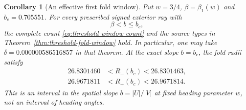 \documentclass[11pt,a4paper]{article}
\newtheorem{corollary}[theorem]{Corollary}
\theoremstyle{remark}\newtheorem{remark}[theorem]{Remark}
\begin{document}
\begin{corollary}[An effective first fold window]
\label{cor:effective-fold-window}
Put $w=3/4$, $\beta=\beta_1(w)$ and $b_c=0.705551$.
For every prescribed signed exterior ray with
\begin{equation}\label{eq:effective-fold-slopes}
 \beta<b\le b_c,
\end{equation}
the complete count \eqref{eq:threshold-window-count} and the source
types in Theorem~\ref{thm:threshold-fold-window} hold. In particular,
one may take $\delta=0.000000586516857$ in that theorem.
At the exact slope $b=b_c$, the fold radii satisfy
\begin{equation}\label{eq:cap-fold-radii}
 \begin{split}
 26.8301460&<R_-(b_c)<26.8301463,\\
 26.9671811&<R_+(b_c)<26.9671814.
 \end{split}
\end{equation}
This is an interval in the spatial slope $b=|U|/|V|$ at fixed
heading parameter $w$, not an interval of heading angles.
\end{corollary}
\end{document}
